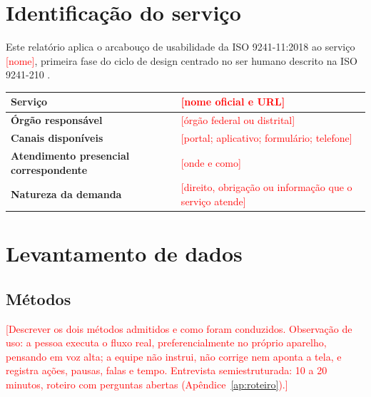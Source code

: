 \documentclass[
  12pt,
  oneside,
  a4paper,
  chapter=TITLE,
  section=TITLE,
  english,
  brazil
]{abntex2}
\newcommand{\preencher}[1]{\textcolor{red}{[#1]}}
\begin{document}
\chapter{Identificação do serviço}\label{cap:identificacao}

Este relatório aplica o arcabouço de usabilidade da ISO 9241-11:2018
\cite{iso9241-11-2018} ao serviço \preencher{nome}, primeira fase do ciclo de
design centrado no ser humano descrito na ISO 9241-210 \cite{iso9241-210-2019}.

\begin{quadro}[htbp]
  \caption{Identificação do serviço}\label{qua:identificacao}
  \centering\small
  \begin{tabularx}{\textwidth}{|l|X|}\hline
    \textbf{Serviço}             & \preencher{nome oficial e URL} \\\hline
    \textbf{Órgão responsável}   & \preencher{órgão federal ou distrital} \\\hline
    \textbf{Canais disponíveis}  & \preencher{portal; aplicativo; formulário; telefone} \\\hline
    \textbf{Atendimento presencial correspondente} & \preencher{onde e como} \\\hline
    \textbf{Natureza da demanda} & \preencher{direito, obrigação ou informação que o serviço atende} \\\hline
  \end{tabularx}
\end{quadro}

\chapter{Levantamento de dados}\label{cap:levantamento}

\section{Métodos}

\preencher{Descrever os dois métodos admitidos e como foram conduzidos.
Observação de uso: a pessoa executa o fluxo real, preferencialmente no próprio
aparelho, pensando em voz alta; a equipe não instrui, não corrige nem aponta a
tela, e registra ações, pausas, falas e tempo. Entrevista semiestruturada: 10 a
20 minutos, roteiro com perguntas abertas (Apêndice~\ref{ap:roteiro}).}
\end{document}
